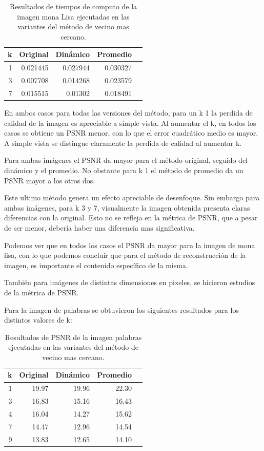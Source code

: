 \documentclass[a4paper]{article}
\newcounter{col}
\begin{document}
\begin{table}[H]
\centering
\begin{tabular}{|r|r|r|r|r|}
\hline
\multicolumn{1}{|c|}{k} & \multicolumn{1}{c|}{Original} & \multicolumn{1}{c|}{Dinámico} & \multicolumn{1}{c|}{Promedio} \\ \hline
1 & 0.021445 & 0.027944 & 0.030327 \\ \hline
3 & 0.007708 &  0.014268 & 0.023579 \\ \hline
7 & 0.015515 &  0.01302 &  0.018491 \\ \hline
\end{tabular}
\caption{Resultados de tiempos de computo de la imagen mona Lisa ejecutadas en las variantes del m\'etodo de vecino mas cercano.}
\label{}
\end{table}


En ambos casos para todas las versiones del método, para un k 1 la perdida de calidad de la imagen es apreciable a simple vista. Al aumentar el k, en todos los casos se obtiene un PSNR menor, con lo que el error cuadrático medio es mayor. A simple vista se distingue claramente la perdida de calidad al aumentar k.

Para ambas imágenes el PSNR da mayor para el método original, seguido del dinámico y el promedio. No obstante para k 1 el método de promedio da un PSNR mayor a los otros dos.

Este ultimo método genera un efecto apreciable de desenfoque. Sin embargo para ambas imágenes, para k 3 y 7, visualmente la imagen obtenida presenta claras diferencias con la original. Esto no se refleja en la métrica de PSNR, que a pesar de ser menor, debería haber una diferencia mas significativa.

Podemos ver que en todos los casos el PSNR da mayor para la imagen de mona lisa, con lo que podemos concluir que para el método de reconstrucción de la imagen, es importante el contenido específico de la misma. 


También para imágenes de distintas dimensiones en pixeles, se hicieron estudios de la métrica de PSNR.

Para la imagen de palabras se obtuvieron los siguientes resultados para los distintos valores de k:

\begin{table}[H]
\centering
\begin{tabular}{|r|r|r|r|r|}
\hline
\multicolumn{1}{|c|}{k} & \multicolumn{1}{c|}{Original} & \multicolumn{1}{c|}{Dinámico} & \multicolumn{1}{c|}{Promedio} \\ \hline
1 & 19.97 & 19.96 & 22.30 \\ \hline
3 & 16.83 &  15.16 & 16.43 \\ \hline
4 & 16.04 &  14.27 & 15.62  \\ \hline
7 & 14.47 &  12.96 & 14.54 \\ \hline
9 &13.83 &  12.65 & 14.10 \\ \hline
\end{tabular}
\caption{Resultados de PSNR de la imagen palabras ejecutadas en las variantes del m\'etodo de vecino mas cercano.}
\label{}
\end{table}
\end{document}

